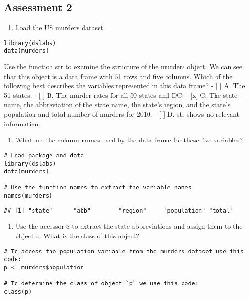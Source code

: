 \documentclass[
]{article}
\providecommand{\tightlist}{%
  \setlength{\itemsep}{0pt}\setlength{\parskip}{0pt}}
\begin{document}
\hypertarget{assessment-2}{%
\subsection{Assessment 2}\label{assessment-2}}

\begin{enumerate}
\def\labelenumi{\arabic{enumi}.}
\tightlist
\item
  Load the US murders dataset.
\end{enumerate}

\begin{verbatim}
library(dslabs)  
data(murders)
\end{verbatim}

Use the function str to examine the structure of the murders object. We
can see that this object is a data frame with 51 rows and five columns.
Which of the following best describes the variables represented in this
data frame? - {[} {]} A. The 51 states. - {[} {]} B. The murder rates
for all 50 states and DC. - {[}x{]} C. The state name, the abbreviation
of the state name, the state's region, and the state's population and
total number of murders for 2010. - {[} {]} D. str shows no relevant
information.

\begin{enumerate}
\def\labelenumi{\arabic{enumi}.}
\setcounter{enumi}{1}
\tightlist
\item
  What are the column names used by the data frame for these five
  variables?
\end{enumerate}

\begin{verbatim}
# Load package and data
library(dslabs)
data(murders)

# Use the function names to extract the variable names 
names(murders)
\end{verbatim}

\begin{verbatim}
## [1] "state"      "abb"        "region"     "population" "total"
\end{verbatim}

\begin{enumerate}
\def\labelenumi{\arabic{enumi}.}
\setcounter{enumi}{2}
\tightlist
\item
  Use the accessor \$ to extract the state abbreviations and assign them
  to the object a. What is the class of this object?
\end{enumerate}

\begin{verbatim}
# To access the population variable from the murders dataset use this code:
p <- murders$population 

# To determine the class of object `p` we use this code:
class(p)
\end{verbatim}
\end{document}

